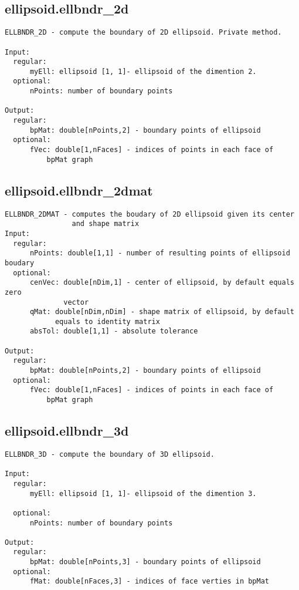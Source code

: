 \subsection{\texorpdfstring{ellipsoid.ellbndr\_2d}{ellbndr\_2d}}\label{method:ellipsoid.ellbndr2d}
\begin{verbatim}
ELLBNDR_2D - compute the boundary of 2D ellipsoid. Private method.

Input:
  regular:
      myEll: ellipsoid [1, 1]- ellipsoid of the dimention 2.
  optional:
      nPoints: number of boundary points

Output:
  regular:
      bpMat: double[nPoints,2] - boundary points of ellipsoid
  optional:
      fVec: double[1,nFaces] - indices of points in each face of
          bpMat graph
\end{verbatim}
\subsection{\texorpdfstring{ellipsoid.ellbndr\_2dmat}{ellbndr\_2dmat}}\label{method:ellipsoid.ellbndr2dmat}
\begin{verbatim}
ELLBNDR_2DMAT - computes the boudary of 2D ellipsoid given its center
                and shape matrix
Input:
  regular:
      nPoints: double[1,1] - number of resulting points of ellipsoid boudary
  optional:
      cenVec: double[nDim,1] - center of ellipsoid, by default equals zero
              vector
      qMat: double[nDim,nDim] - shape matrix of ellipsoid, by default
            equals to identity matrix
      absTol: double[1,1] - absolute tolerance

Output:
  regular:
      bpMat: double[nPoints,2] - boundary points of ellipsoid
  optional:
      fVec: double[1,nFaces] - indices of points in each face of
          bpMat graph
\end{verbatim}
\subsection{\texorpdfstring{ellipsoid.ellbndr\_3d}{ellbndr\_3d}}\label{method:ellipsoid.ellbndr3d}
\begin{verbatim}
ELLBNDR_3D - compute the boundary of 3D ellipsoid.

Input:
  regular:
      myEll: ellipsoid [1, 1]- ellipsoid of the dimention 3.

  optional:
      nPoints: number of boundary points

Output:
  regular:
      bpMat: double[nPoints,3] - boundary points of ellipsoid
  optional:
      fMat: double[nFaces,3] - indices of face verties in bpMat
\end{verbatim}
